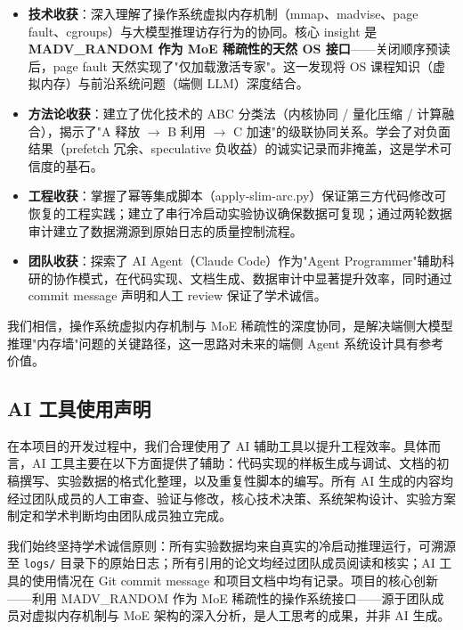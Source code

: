 \begin{itemize}
    \item \textbf{技术收获}：深入理解了操作系统虚拟内存机制（mmap、madvise、page fault、cgroups）与大模型推理访存行为的协同。核心 insight 是\textbf{MADV\_RANDOM 作为 MoE 稀疏性的天然 OS 接口}——关闭顺序预读后，page fault 天然实现了"仅加载激活专家"。这一发现将 OS 课程知识（虚拟内存）与前沿系统问题（端侧 LLM）深度结合。
    \item \textbf{方法论收获}：建立了优化技术的 ABC 分类法（内核协同 / 量化压缩 / 计算融合），揭示了"A 释放 $\to$ B 利用 $\to$ C 加速"的级联协同关系。学会了对负面结果（prefetch 冗余、speculative 负收益）的诚实记录而非掩盖，这是学术可信度的基石。
    \item \textbf{工程收获}：掌握了幂等集成脚本（apply-slim-arc.py）保证第三方代码修改可恢复的工程实践；建立了串行冷启动实验协议确保数据可复现；通过两轮数据审计建立了数据溯源到原始日志的质量控制流程。
    \item \textbf{团队收获}：探索了 AI Agent（Claude Code）作为"Agent Programmer"辅助科研的协作模式，在代码实现、文档生成、数据审计中显著提升效率，同时通过 commit message 声明和人工 review 保证了学术诚信。
\end{itemize}

我们相信，操作系统虚拟内存机制与 MoE 稀疏性的深度协同，是解决端侧大模型推理"内存墙"问题的关键路径，这一思路对未来的端侧 Agent 系统设计具有参考价值。

\subsection{AI 工具使用声明}

在本项目的开发过程中，我们合理使用了 AI 辅助工具以提升工程效率。具体而言，AI 工具主要在以下方面提供了辅助：代码实现的样板生成与调试、文档的初稿撰写、实验数据的格式化整理，以及重复性脚本的编写。所有 AI 生成的内容均经过团队成员的人工审查、验证与修改，核心技术决策、系统架构设计、实验方案制定和学术判断均由团队成员独立完成。

我们始终坚持学术诚信原则：所有实验数据均来自真实的冷启动推理运行，可溯源至 \texttt{logs/} 目录下的原始日志；所有引用的论文均经过团队成员阅读和核实；AI 工具的使用情况在 Git commit message 和项目文档中均有记录。项目的核心创新——利用 MADV\_RANDOM 作为 MoE 稀疏性的操作系统接口——源于团队成员对虚拟内存机制与 MoE 架构的深入分析，是人工思考的成果，并非 AI 生成。
